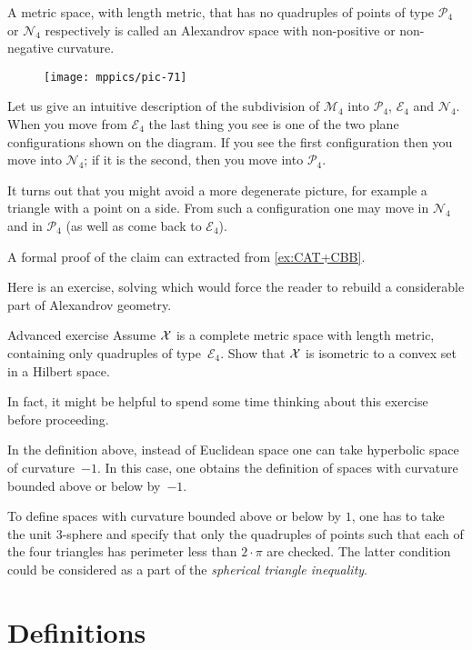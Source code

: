 A metric space, with length metric, 
that has no quadruples of points of type $\mathcal{P}_4$ or $\mathcal{N}_4$
respectively 
is called an Alexandrov space with non-positive or non-negative curvature.

\begin{wrapfigure}{r}{33mm}
\vskip-4mm
\centering
\texttt{[image: mppics/pic-71]}
\end{wrapfigure}

Let us give an intuitive description of the subdivision of $\mathcal{M}_4$ into  $\mathcal{P}_4$, $\mathcal{E}_4$ and $\mathcal{N}_4$.
When you move from $\mathcal{E}_4$ the last thing you see is one of the two plane configurations shown on the diagram.
If you see the first configuration then you move into $\mathcal{N}_4$;
if it is the second, then you move into $\mathcal{P}_4$.

It turns out that you might avoid a more degenerate picture, for example a triangle with a point on a side.
From such a configuration one may move in $\mathcal{N}_4$ and in $\mathcal{P}_4$ (as well as come back to $\mathcal{E}_4$).

A formal proof of the claim can extracted from \ref{ex:CAT+CBB}.

Here is an exercise, solving which would force the reader to rebuild a considerable part of Alexandrov geometry.

\begin{thm}{Advanced exercise}\label{ex:convex-set}
Assume $\mathcal{X}$ is a complete metric space with length metric, 
containing only quadruples of type~$\mathcal{E}_4$.
Show that $\mathcal{X}$ is isometric to a convex set in a Hilbert space.
\end{thm}

In fact, it might be helpful to spend some time thinking about this exercise before proceeding.

In the definition above, 
instead of  Euclidean space 
one can take  
hyperbolic space of curvature~$-1$.
In this case,
one obtains the definition of spaces with curvature bounded above or below by~$-1$.

To define spaces with curvature bounded above or below by $1$,
one has to take the unit 3-sphere 
and specify that only the quadruples of points such that each of the four triangles has perimeter 
less than $2\cdot\pi$ are checked.
The latter condition could be considered as a part of the {}\emph{spherical triangle inequality}.

\section{Definitions}\label{sec:mod-tri/angles}

